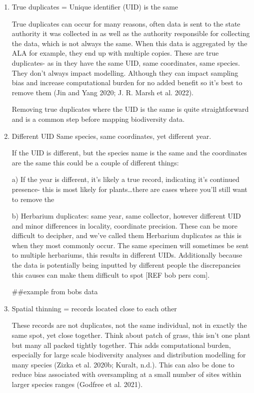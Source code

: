 \documentclass[
  letterpaper,
  DIV=11,
  numbers=noendperiod,
  oneside]{scrreprt}
\begin{document}
\begin{enumerate}
\def\labelenumi{\arabic{enumi}.}
\item
  True duplicates = Unique identifier (UID) is the same

  True duplicates can occur for many reasons, often data is sent to the
  state authority it was collected in as well as the authority
  responsible for collecting the data, which is not always the same.
  When this data is aggregated by the ALA for example, they end up with
  multiple copies. These are true duplicates- as in they have the same
  UID, same coordinates, same species. They don't always impact
  modelling. Although they can impact sampling bias and increase
  computational burden for no added benefit so it's best to remove them
  (Jin and Yang 2020; J. R. Marsh et al. 2022).

  Removing true duplicates where the UID is the same is quite
  straightforward and is a common step before mapping biodiversity data.
\item
  Different UID Same species, same coordinates, yet different year.

  If the UID is different, but the species name is the same and the
  coordinates are the same this could be a couple of different things:

  a) If the year is different, it's likely a true record, indicating
  it's continued presence- this is most likely for plants\ldots there
  are cases where you'll still want to remove the

  b) Herbarium duplicates: same year, same collector, however different
  UID and minor differences in locality, coordinate precision. These can
  be more difficult to decipher, and we've called them Herbarium
  duplicates as this is when they most commonly occur. The same specimen
  will sometimes be sent to multiple herbariums, this results in
  different UIDs. Additionally because the data is potentially being
  inputted by different people the discrepancies this causes can make
  them difficult to spot {[}REF bob pers com{]}.

  \#\#example from bobs data
\item
  Spatial thinning = records located close to each other

  These records are not duplicates, not the same individual, not in
  exactly the same spot, yet close together. Think about patch of grass,
  this isn't one plant but many all packed tightly together. This adds
  computational burden, especially for large scale biodiversity analyses
  and distribution modelling for many species (Zizka et al. 2020b;
  Kuralt, n.d.). This can also be done to reduce bias associated with
  oversampling at a small number of sites within larger species ranges
  (Godfree et al. 2021).
\end{enumerate}
\end{document}
